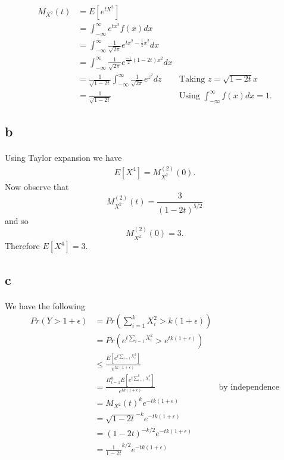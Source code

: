 \documentclass[letterpaper,12pt,oneside,onecolumn]{article}
\begin{document}
\paragraph{}
\begin{align*}
M_{X^2}(t) &= E[e^{tX^2}] \\
&= \int_{-\infty}^\infty e^{tx^2}f(x)dx \\
&=\int_{-\infty}^\infty \frac{1}{\sqrt{2\pi}}e^{tx^2-\frac{1}{2}x^2}dx \\
&= \int_{-\infty}^\infty \frac{1}{\sqrt{2\pi}}e^{\frac{-1}{2}(1-2t)x^2}dx \\
&= \frac{1}{\sqrt{1-2t}}\int_{-\infty}^\infty \frac{1}{\sqrt{2\pi}}e^{z^2}dz &\text{Taking $z=\sqrt{1-2t}x$} \\
&= \frac{1}{\sqrt{1-2t}} &\text{Using $\int_{-\infty}^\infty f(x)dx = 1$}.
\end{align*}
\subsection{b}
\paragraph{}
Using Taylor expansion we have
\begin{align*}
E[X^4] = M_{X^2}^{(2)}(0).
\end{align*}
Now observe that
$$M_{X^2}^{(2)}(t) = \frac{3}{(1-2t)^{5/2}}$$
and so
$$M_{X^2}^{(2)}(0) = 3.$$
Therefore $E[X^4] = 3$.
\subsection{c}
\paragraph{}
We have the following
\begin{align*}
Pr(Y > 1+\epsilon) &= Pr(\sum_{i=1}^kX_i^2 > k(1+\epsilon))\\
&=Pr(e^{t\sum_{i=1}X_i^2} > e^{tk(1+\epsilon)})\\
&\leq \frac{E[e^{t\sum_{i=1}X_i^2}]}{e^{tk(1+\epsilon)}} \\
&= \frac{\Pi_{i=1}^kE[e^{t\sum_{i=1}^kX_i^2}]}{e^{tk(1+\epsilon)}} &\text{by independence}\\
&=M_{X^2}(t)^ke^{-tk(1+\epsilon)}\\
&=\sqrt{1-2t}^{-k}e^{-tk(1+\epsilon)} \\
&= (1-2t)^{-k/2}e^{-tk(1+\epsilon)}\\
&= \frac{1}{1-2t}^{k/2}e^{-tk(1+\epsilon)}
\end{align*}
\end{document}
